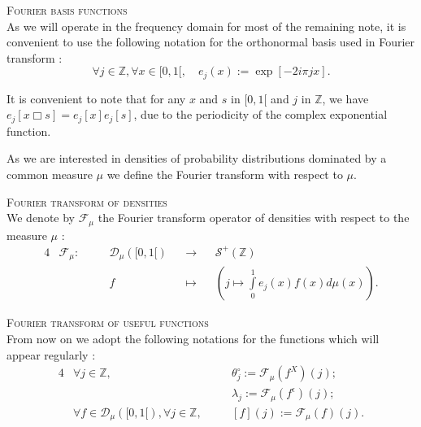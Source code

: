 \begin{nota}{\textsc{Fourier basis functions}\\}\label{NOTA_INTRO_CIRCULARDECONVOLUTION_FOURIERBASIS}
As we will operate in the frequency domain for most of the remaining note, it is convenient to use the following notation for the orthonormal basis used in Fourier transform :
\[\forall j \in \mathds{Z}, \forall x \in [0, 1[, \quad e_{j}(x) := \exp[- 2 i \pi j x].\]
\end{nota}

\begin{rmk}\label{RMK_INTRO_CIRCULARDECONVOLUTION_PERIOD}
It is convenient to note that for any $x$ and $s$ in $[0, 1[$ and $j$ in $\mathds{Z}$, we have $e_{j}[x \Box s] = e_{j}[x]e_{j}[s]$, due to the periodicity of the complex exponential function.
\end{rmk}

As we are interested in densities of probability distributions dominated by a common measure $\mu$ we define the Fourier transform with respect to $\mu$.

\begin{de}{\textsc{Fourier transform of densities}\\}\label{DE_INTRO_CIRCULARDECONVOLUTION_FOURIERDENSITY}
We denote by $\mathcal{F}_{\mu}$ the Fourier transform operator of densities with respect to the measure $\mu$ :
\begin{alignat*}{4}
&\mathcal{F}_{\mu} : \quad && \mathcal{D}_{\mu}([0,1[) &&\rightarrow&& \mathcal{S}^{+}(\mathds{Z})\\
& && f && \mapsto && \left(j \mapsto \int\limits_{0}^{1} e_{j}(x) f(x) d\mu(x)\right).
\end{alignat*}
\end{de}

\begin{nota}{\textsc{Fourier transform of useful functions}\\}\label{NOTA_INTRO_CIRCULARDECONVOLUTION_FOURIERTRANSFORM}
From now on we adopt the following notations for the functions which will appear regularly :
\begin{alignat*}{4}
&\forall j \in \mathds{Z}, && \theta^{\circ}_{j} := \mathcal{F}_{\mu}(f^{X})(j);\\
& && \lambda_{j} := \mathcal{F}_{\mu}(f^{\epsilon})(j);\\
&\forall f \in \mathcal{D}_{\mu}([0, 1[), \forall j \in \mathds{Z}, \quad && [f](j) := \mathcal{F}_{\mu}(f)(j).\\
\end{alignat*}
\end{nota}


